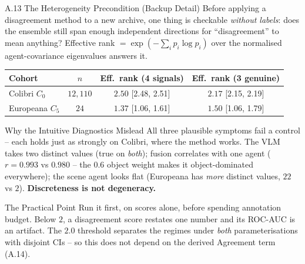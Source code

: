 \documentclass[aspectratio=169,11pt]{beamer}
\begin{document}
\begin{frame}{A.13 The Heterogeneity Precondition (Backup Detail)}
\scriptsize
Before applying a disagreement method to a new archive, one thing is checkable \emph{without labels}: does the ensemble still span enough independent directions for ``disagreement'' to mean anything? Effective rank $=\exp(-\sum_i p_i \log p_i)$ over the normalised agent-covariance eigenvalues answers it.

\begin{center}\scriptsize
\begin{tabular}{lccc}
\toprule
\textbf{Cohort} & \textbf{$n$} & \textbf{Eff.\ rank (4 signals)} & \textbf{Eff.\ rank (3 genuine)} \\
\midrule
Colibri $C_0$ & $12{,}110$ & $2.50$ {\tiny[2.48, 2.51]} & $2.17$ {\tiny[2.15, 2.19]} \\
Europeana $C_5$ & $24$ & $\mathbf{1.37}$ {\tiny[1.06, 1.61]} & $\mathbf{1.50}$ {\tiny[1.06, 1.79]} \\
\bottomrule
\end{tabular}
\end{center}

\begin{block}{\scriptsize Why the Intuitive Diagnostics Mislead}
\tiny All three plausible symptoms fail a control -- each holds just as strongly on Colibri, where the method works. The VLM takes two distinct values (true on \emph{both}); fusion correlates with one agent ($r=0.993$ vs $0.980$ -- the $0.6$ object weight makes it object-dominated everywhere); the scene agent looks flat (Europeana has \emph{more} distinct values, $22$ vs $2$). \textbf{Discreteness is not degeneracy.}
\end{block}

\begin{alertblock}{\scriptsize The Practical Point}
\tiny Run it first, on scores alone, before spending annotation budget. Below $2$, a disagreement score restates one number and its ROC-AUC is an artifact. The $2.0$ threshold separates the regimes under \emph{both} parameterisations with disjoint CIs -- so this does not depend on the derived Agreement term (A.14).
\end{alertblock}
\end{frame}
\end{document}
